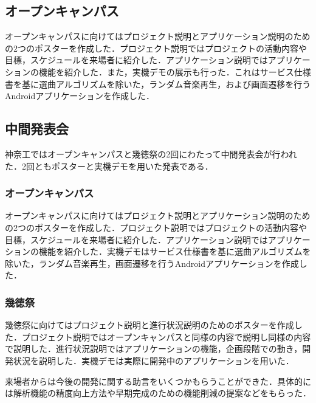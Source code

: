 
\subsection{オープンキャンパス}
\par オープンキャンパスに向けてはプロジェクト説明とアプリケーション説明のための2つのポスターを作成した．プロジェクト説明ではプロジェクトの活動内容や目標，スケジュールを来場者に紹介した．アプリケーション説明ではアプリケーションの機能を紹介した．また，実機デモの展示も行った．これはサービス仕様書を基に選曲アルゴリズムを除いた，ランダム音楽再生，および画面遷移を行うAndroidアプリケーションを作成した．

\subsection{中間発表会}
\par 神奈工ではオープンキャンパスと幾徳祭の2回にわたって中間発表会が行われた．2回ともポスターと実機デモを用いた発表である．

\subsubsection{オープンキャンパス}
\par オープンキャンパスに向けてはプロジェクト説明とアプリケーション説明のための2つのポスターを作成した．プロジェクト説明ではプロジェクトの活動内容や目標，スケジュールを来場者に紹介した．アプリケーション説明ではアプリケーションの機能を紹介した．実機デモはサービス仕様書を基に選曲アルゴリズムを除いた，ランダム音楽再生，画面遷移を行うAndroidアプリケーションを作成した．

\subsubsection{幾徳祭}
\par 幾徳祭に向けてはプロジェクト説明と進行状況説明のためのポスターを作成した．プロジェクト説明ではオープンキャンパスと同様の内容で説明し同様の内容で説明した．進行状況説明ではアプリケーションの機能，企画段階での動き，開発状況を説明した．実機デモは実際に開発中のアプリケーションを用いた．

\par 来場者からは今後の開発に関する助言をいくつかもらうことができた．具体的には解析機能の精度向上方法や早期完成のための機能削減の提案などをもらった．
